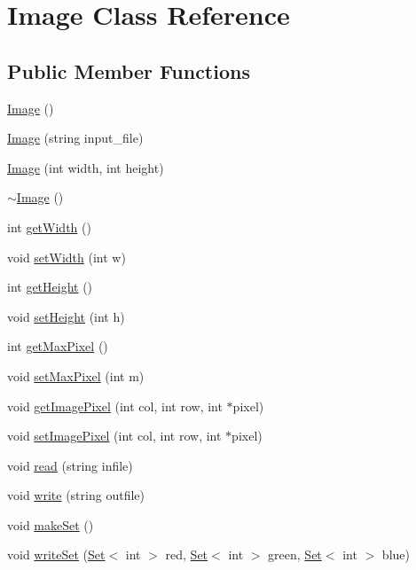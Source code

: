 \hypertarget{class_image}{}\section{Image Class Reference}
\label{class_image}
\subsection*{Public Member Functions}
\begin{DoxyCompactItemize}
\item 
\hyperlink{class_image_a58edd1c45b4faeb5f789b0d036d02313}{Image} ()
\item 
\hyperlink{class_image_af2d2b2b46060ce7d4dda966d1bb29b45}{Image} (string input\+\_\+file)
\item 
\hyperlink{class_image_afb0339b802ed560e69eb07358d30198f}{Image} (int width, int height)
\item 
\hyperlink{class_image_a0294f63700543e11c0f0da85601c7ae5}{$\sim$\+Image} ()
\item 
int \hyperlink{class_image_af2720a072812763395512fc3c8c21362}{get\+Width} ()
\item 
void \hyperlink{class_image_a385abd0ecca8787fe15d9a72ac60001a}{set\+Width} (int w)
\item 
int \hyperlink{class_image_aa4e1f064e5e1f3f04ad605408f1ec3af}{get\+Height} ()
\item 
void \hyperlink{class_image_a6e15783dcc55c301f4e887e27a7c38be}{set\+Height} (int h)
\item 
int \hyperlink{class_image_a4fc6fccb6a5cdb33dd2ee14d6d785075}{get\+Max\+Pixel} ()
\item 
void \hyperlink{class_image_a726a71590bc574158cb5d4994c4b12d1}{set\+Max\+Pixel} (int m)
\item 
void \hyperlink{class_image_a06bf6921136ef94ef30a788dbf609ce9}{get\+Image\+Pixel} (int col, int row, int $\ast$pixel)
\item 
void \hyperlink{class_image_a44556ed55401215428fbaae43256315c}{set\+Image\+Pixel} (int col, int row, int $\ast$pixel)
\item 
void \hyperlink{class_image_afd7841c2016dc76156a43cc4cd348680}{read} (string infile)
\item 
void \hyperlink{class_image_addd74434babf60a45c1d7b9fc155723a}{write} (string outfile)
\item 
void \hyperlink{class_image_a50edfdcc8b618d34496d035cfd1cad28}{make\+Set} ()
\item 
void \hyperlink{class_image_aeb66578047d02ea0d9a91d804a08b61e}{write\+Set} (\hyperlink{class_set}{Set}$<$ int $>$ red, \hyperlink{class_set}{Set}$<$ int $>$ green, \hyperlink{class_set}{Set}$<$ int $>$ blue)

\end{DoxyCompactItemize}
